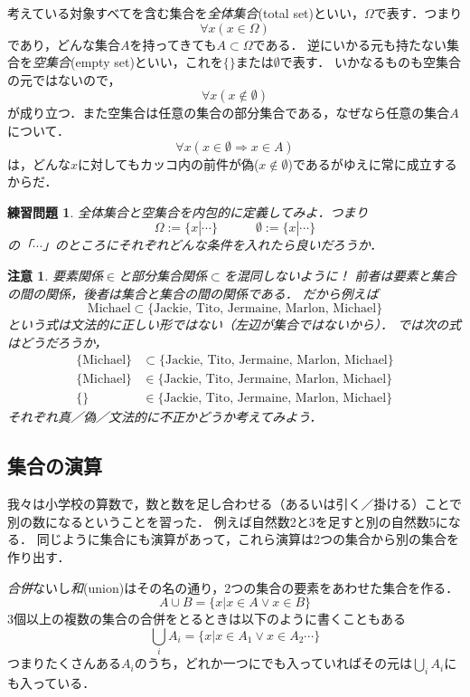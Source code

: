 \documentclass[11pt,a4paper]{jsarticle}
\newtheorem{exercise}{練習問題}[section]
\newtheorem{attn}{注意}[section]
\begin{document}
考えている対象すべてを含む集合を\emph{全体集合}(total set)といい，$\Omega$で表す．つまり
\[
\forall x (x \in \Omega)
\]
であり，どんな集合$A$を持ってきても$A \subset \Omega$である．
逆にいかる元も持たない集合を\emph{空集合}(empty set)といい，これを$\{\}$または$\emptyset$で表す．
いかなるものも空集合の元ではないので，
\[
\forall x (x \not\in \emptyset)
\]
が成り立つ．また空集合は任意の集合の部分集合である，なぜなら任意の集合$A$について．
\[
\forall x (x \in \emptyset \Rightarrow x \in A)
\]
は，どんな$x$に対してもカッコ内の前件が偽($x \not\in \emptyset$)であるがゆえに常に成立するからだ．


\begin{exercise}
全体集合と空集合を内包的に定義してみよ．つまり
\[
\Omega := \{ x | \cdots \}  \hspace{3em} \emptyset := \{ x | \cdots \}
\]
の「$\cdots$」のところにそれぞれどんな条件を入れたら良いだろうか． 
\end{exercise}

\begin{attn}
要素関係$\in$と部分集合関係$\subset$を混同しないように！
前者は要素と集合の間の関係，後者は集合と集合の間の関係である．
だから例えば
\[
\text{Michael} \subset \{ \text{Jackie, Tito, Jermaine, Marlon, Michael}\}  
\]
という式は文法的に正しい形ではない（左辺が集合ではないから）．
では次の式はどうだろうか，
\begin{align*}
\{ \text{Michael} \} &\subset \{ \text{Jackie, Tito, Jermaine, Marlon, Michael}\}  \\
\{ \text{Michael} \} &\in \{ \text{Jackie, Tito, Jermaine, Marlon, Michael}\}  \\
\{  \} &\in \{ \text{Jackie, Tito, Jermaine, Marlon, Michael}\}  
\end{align*}
それぞれ真／偽／文法的に不正かどうか考えてみよう．
\end{attn}

\subsection{集合の演算}
我々は小学校の算数で，数と数を足し合わせる（あるいは引く／掛ける）ことで別の数になるということを習った．
例えば自然数2と3を足すと別の自然数5になる．
同じように集合にも演算があって，これら演算は2つの集合から別の集合を作り出す．

\emph{合併}ないし\emph{和}(union)はその名の通り，2つの集合の要素をあわせた集合を作る．
\[
 A \cup B = \{ x | x \in A \vee x \in B\}
\]
3個以上の複数の集合の合併をとるときは以下のように書くこともある
\[
 \bigcup_i A_i = \{ x | x \in A_1 \vee x \in A_2 \cdots \}
\]
つまりたくさんある$A_i$のうち，どれか一つにでも入っていればその元は$\bigcup_i A_i$にも入っている．
\end{document}
